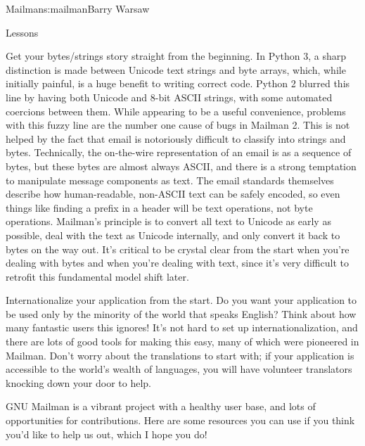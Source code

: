 \begin{aosachapter}{Mailman}{s:mailman}{Barry Warsaw}
\begin{aosasect1}{Lessons}
\begin{aosaitemize}
\item Get your bytes/strings story straight from the beginning.  In
  Python 3, a sharp distinction is made between Unicode text strings
  and byte arrays, which, while initially painful, is a huge benefit
  to writing correct code.  Python 2 blurred this line by having both
  Unicode and 8-bit ASCII strings, with some automated coercions
  between them.  While appearing to be a useful convenience, problems
  with this fuzzy line are the number one cause of bugs in Mailman 2.
  This is not helped by the fact that email is notoriously difficult
  to classify into strings and bytes. Technically, the on-the-wire
  representation of an email is as a sequence of bytes, but these
  bytes are almost always ASCII, and there is a strong temptation to
  manipulate message components as text.  The email standards
  themselves describe how human-readable, non-ASCII text can be safely
  encoded, so even things like finding a  prefix in a
   header will be text operations, not byte operations.
  Mailman's principle is to convert all text to Unicode as early as
  possible, deal with the text as Unicode internally, and only convert
  it back to bytes on the way out.  It's critical to be crystal clear
  from the start when you're dealing with bytes and when you're
  dealing with text, since it's very difficult to
  retrofit this fundamental model shift later.

\item Internationalize your application from the start.  Do you want
  your application to be used only by the minority of the world that
  speaks English?  Think about how many fantastic users this ignores!
  It's not hard to set up internationalization, and there are lots of
  good tools for making this easy, many of which were pioneered in
  Mailman.  Don't worry about the translations to start with; if your
  application is accessible to the world's wealth of languages, you
  will have volunteer translators knocking down your door to help.

\end{aosaitemize}

GNU Mailman is a vibrant project with a healthy user base, and lots of
opportunities for contributions.  Here are some resources you can use
if you think you'd like to help us out, which I hope you do!


\end{aosasect1}
\end{aosachapter}
